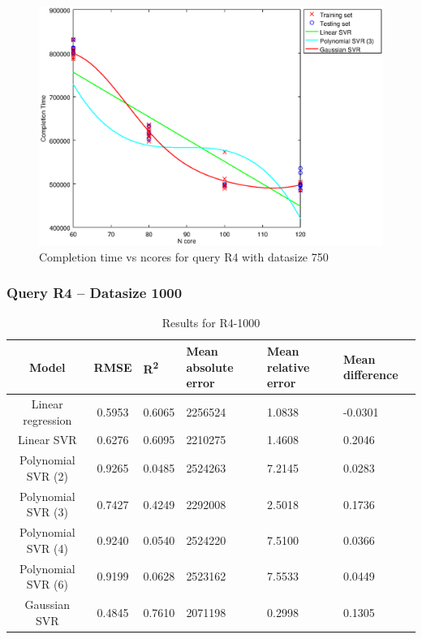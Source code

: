 \documentclass[a4paper,11pt]{article}
\begin{document}
\begin {figure}[hbtp]
\centering
\includegraphics[width=\textwidth]{output/R4_750_ONLY_1_LINEAR_NCORE/plot_R4_750_bestmodels.eps}
\caption{Completion time vs ncores for query R4 with datasize 750}
\label{fig:coreonly_linear_R4_750}
\end {figure}

\newpage
\subsubsection{Query R4 -- Datasize 1000}
\begin{table}[H]
	\centering
	\begin{adjustbox}{center}
		\begin{tabular}{c | c M{1.2cm} M{2.5cm} M{2.5cm} M{1.8cm}}
			Model & RMSE & R\textsuperscript{2} & Mean absolute error & Mean relative error & Mean difference \tabularnewline
			\hline
			Linear regression & 0.5953 & 0.6065 & 2256524 & 1.0838 & -0.0301 \\
			Linear SVR & 0.6276 & 0.6095 & 2210275 & 1.4608 & 0.2046 \\
			Polynomial SVR (2) & 0.9265 & 0.0485 & 2524263 & 7.2145 & 0.0283 \\
			Polynomial SVR (3) & 0.7427 & 0.4249 & 2292008 & 2.5018 & 0.1736 \\
			Polynomial SVR (4) & 0.9240 & 0.0540 & 2524220 & 7.5100 & 0.0366 \\
			Polynomial SVR (6) & 0.9199 & 0.0628 & 2523162 & 7.5533 & 0.0449 \\
			Gaussian SVR & 0.4845 & 0.7610 & 2071198 & 0.2998 & 0.1305 \\
		\end{tabular}
	\end{adjustbox}
	\\
	\caption{Results for R4-1000}
	\label{fig:coreonly_linear_R4_1000}
\end{table}
\end{document}
